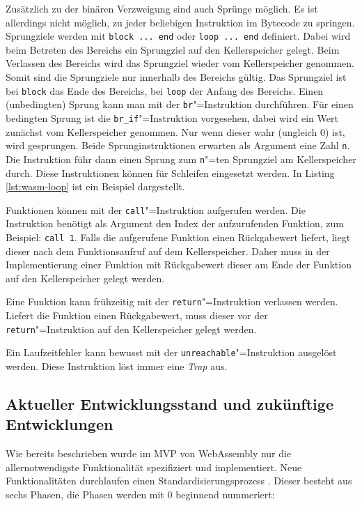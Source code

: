 Zusätzlich zu der binären Verzweigung sind auch Sprünge möglich. Es ist allerdings nicht möglich, zu jeder beliebigen Instruktion im Bytecode zu springen. Sprungziele werden mit \lstinline{block ... end} oder \lstinline{loop ... end} definiert. Dabei wird beim Betreten des Bereichs ein Sprungziel auf den Kellerspeicher gelegt. Beim Verlassen des Bereichs wird das Sprungziel wieder vom Kellerspeicher genommen. Somit sind die Sprungziele nur innerhalb des Bereichs gültig. Das Sprungziel ist bei \lstinline{block} das Ende des Bereichs, bei \lstinline{loop} der Anfang des Bereichs. Einen (unbedingten) Sprung kann man mit der \lstinline{br}"=Instruktion durchführen. Für einen bedingten Sprung ist die \lstinline{br_if}"=Instruktion vorgesehen, dabei wird ein Wert zunächst vom Kellerspeicher genommen. Nur wenn dieser wahr (ungleich 0) ist, wird gesprungen. Beide Sprunginstruktionen erwarten als Argument eine Zahl \lstinline{n}. Die Instruktion führ dann einen Sprung zum \lstinline{n}"=ten Sprungziel am Kellerspeicher durch. Diese Instruktionen können für Schleifen eingesetzt werden. In Listing \ref{lst:wasm-loop} ist ein Beispiel dargestellt.



Funktionen können mit der \lstinline{call}"=Instruktion aufgerufen werden. Die Instruktion benötigt als Argument den Index der aufzurufenden Funktion, zum Beispiel: \lstinline{call 1}. Falls die aufgerufene Funktion einen Rückgabewert liefert, liegt dieser nach dem Funktionsaufruf auf dem Kellerspeicher. Daher muss in der Implementierung einer Funktion mit Rückgabewert dieser am Ende der Funktion auf den Kellerspeicher gelegt werden.

Eine Funktion kann frühzeitig mit der \lstinline{return}"=Instruktion verlassen werden. Liefert die Funktion einen Rückgabewert, muss dieser vor der \lstinline{return}"=Instruktion auf den Kellerspeicher gelegt werden.

Ein Laufzeitfehler kann bewusst mit der \lstinline{unreachable}"=Instruktion ausgelöst werden. Diese Instruktion löst immer eine \emph{Trap} aus.

\subsection{Aktueller Entwicklungsstand und zukünftige Entwicklungen}
Wie bereits beschrieben wurde im MVP von WebAssembly nur die allernotwendigste Funktionalität spezifiziert und implementiert. Neue Funktionalitäten durchlaufen einen Standardisierungsprozess \cite{WebAssemblyW3CProcess}. Dieser besteht aus sechs Phasen, die Phasen werden mit 0 beginnend nummeriert:

